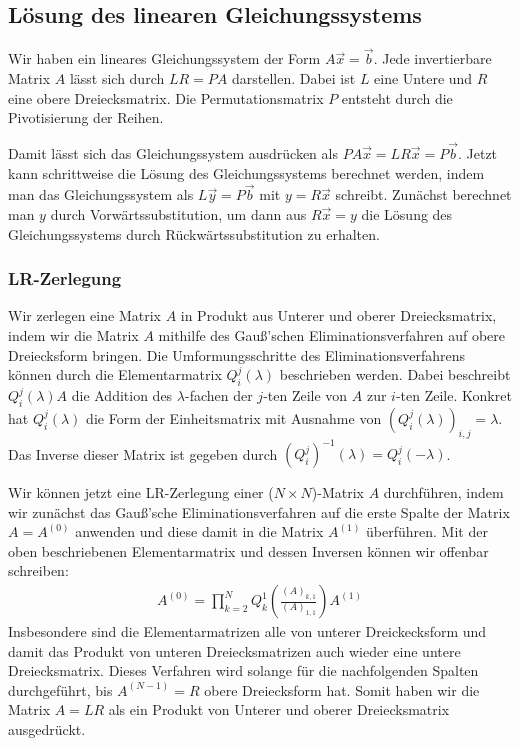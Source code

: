 \documentclass[10pt,a4paper]{article}
\begin{document}
\subsection{Lösung des linearen Gleichungssystems}
Wir haben ein lineares Gleichungssystem der Form $A\vec{x} = \vec{b}$. Jede invertierbare Matrix $A$ lässt sich durch $LR = PA$ darstellen. Dabei ist $L$ eine Untere und $R$ eine obere Dreiecksmatrix. Die Permutationsmatrix $P$ entsteht durch die Pivotisierung der Reihen.

Damit lässt sich das Gleichungssystem ausdrücken als $PA\vec{x} = LR\vec{x} = P\vec{b}$. Jetzt kann schrittweise die Lösung des Gleichungssystems berechnet werden, indem man das Gleichungssystem als $L\vec{y} = P\vec{b}$ mit $y = R\vec{x}$ schreibt. Zunächst berechnet man $y$ durch Vorwärtssubstitution, um dann aus $R\vec{x} = y$ die Lösung des Gleichungssystems durch Rückwärtssubstitution zu erhalten.

\subsubsection{LR-Zerlegung}
Wir zerlegen eine Matrix $A$ in Produkt aus Unterer und oberer Dreiecksmatrix, indem wir die Matrix $A$ mithilfe des Gauß'schen Eliminationsverfahren auf obere Dreiecksform bringen. Die Umformungsschritte des Eliminationsverfahrens können durch die Elementarmatrix $Q^j_i(\lambda)$ beschrieben werden. Dabei beschreibt $Q^j_i (\lambda) A$ die Addition des $\lambda$-fachen der $j$-ten Zeile von $A$ zur $i$-ten Zeile. Konkret hat $Q^j_i (\lambda)$ die Form der Einheitsmatrix mit Ausnahme von $\left(Q^j_i (\lambda) \right)_{i, j} = \lambda$. Das Inverse dieser Matrix ist gegeben durch $(Q^j_i)^{-1} (\lambda) = Q^j_i (-\lambda)$.

Wir können jetzt eine LR-Zerlegung einer ($N \times N$)-Matrix $A$ durchführen, indem wir zunächst das Gauß'sche Eliminationsverfahren auf die erste Spalte der Matrix $A = A^{(0)}$ anwenden und diese damit in die Matrix $A^{(1)}$ überführen. Mit der oben beschriebenen Elementarmatrix und dessen Inversen können wir offenbar schreiben:
\begin{align}
	A^{(0)} = \prod_{k=2}^N Q^1_k (\frac{(A)_{k,1}}{(A)_{1,1}}) A^{(1)}
\end{align}
Insbesondere sind die Elementarmatrizen alle von unterer Dreickecksform und damit das Produkt von unteren Dreiecksmatrizen auch wieder eine untere Dreiecksmatrix. Dieses Verfahren wird solange für die nachfolgenden Spalten durchgeführt, bis $A^{(N-1)} = R$ obere Dreiecksform hat. Somit haben wir die Matrix $A = L R$ als ein Produkt von Unterer und oberer Dreiecksmatrix ausgedrückt. 
\end{document}

